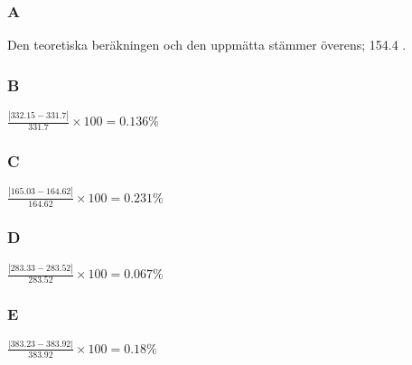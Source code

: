 \documentclass[11pt,a4paper]{article}
\begin{document}
\subsubsection{A}
Den teoretiska beräkningen och den uppmätta stämmer överens; 154.4 \ohm.
\subsubsection{B}
$\frac{|332.15 - 331.7|}{331.7}\times 100 = 0.136\%$
\subsubsection{C}
$\frac{|165.03 - 164.62|}{164.62}\times 100 = 0.231\%$
\subsubsection{D}
$\frac{|283.33 - 283.52|}{283.52}\times 100 = 0.067\%$
\subsubsection{E}
$\frac{|383.23 - 383.92|}{383.92}\times 100 = 0.18\%$
\end{document}
